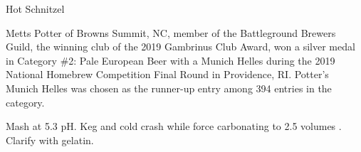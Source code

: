 \stylesection{\stylemunichhelles}

\begin{recipie}{Hot Schnitzel}

\begin{aboutblock}
Metts Potter of Browns Summit, NC, member of the Battleground Brewers Guild, the winning
club of the 2019 Gambrinus Club Award, won a silver medal in Category \#2: Pale European
Beer with a Munich Helles during the 2019 National Homebrew Competition Final Round in
Providence, RI. Potter's Munich Helles was chosen as the runner-up entry among 394 entries
in the category. 
\end{aboutblock}


\begin{methodandtiming}
 
\begin{mashsteps}
\end{mashsteps}

\begin{fermentationsteps}
\end{fermentationsteps}

\begin{directions}
Mash at 5.3 pH. Keg and cold crash while force carbonating to 2.5 volumes .
Clarify with gelatin.
\end{directions}

\end{methodandtiming}

\pagebreak

\begin{ingredientsblock}

\begin{malts}
\end{malts}

\begin{hops}
\end{hops}

\begin{yeasts}
\end{yeasts}

\end{ingredientsblock}

\end{recipie}

